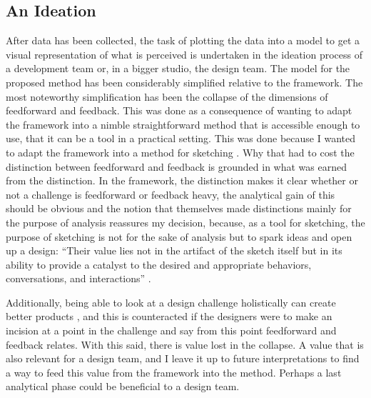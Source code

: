 \subsection{An Ideation}
After data has been collected, the task of plotting the data into a model to get a visual representation of what is perceived is undertaken in the ideation process of a development team or, in a bigger studio, the design team. The model for the proposed method has been considerably simplified relative to the framework. The most noteworthy simplification has been the collapse of the dimensions of feedforward and feedback. This was done as a consequence of wanting to adapt the framework into a nimble straightforward method that is accessible enough to use, that it can be a tool in a practical setting. This was done because I wanted to adapt the framework into a method for sketching \cite{buxton}. Why that had to cost the distinction between feedforward and feedback is grounded in what was earned from the distinction. In the framework, the distinction makes it clear whether or not a challenge is feedforward or feedback heavy, the analytical gain of this should be obvious and the notion that  themselves made distinctions mainly for the purpose of analysis \cite[p. 5]{vermeulen} reassures my decision, because, as a tool for sketching, the purpose of sketching is not for the sake of analysis but to spark ideas and open up a design: ``Their value lies not in the artifact of the sketch itself but in its ability to provide a catalyst to the desired and appropriate behaviors, conversations, and interactions'' \cite[p. 113]{buxton}.

Additionally, being able to look at a design challenge holistically can create better products \cite{buxton}, and this is counteracted if the designers were to make an incision at a point in the challenge and say from this point feedforward and feedback relates. With this said, there is value lost in the collapse. A value that is also relevant for a design team, and I leave it up to future interpretations to find a way to feed this value from the framework into the method. Perhaps a last analytical phase could be beneficial to a design team.

